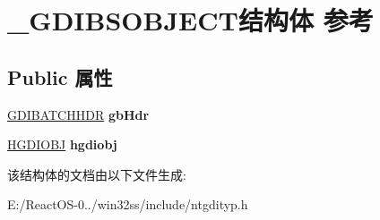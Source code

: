 \hypertarget{struct___g_d_i_b_s_o_b_j_e_c_t}{}\section{\+\_\+\+G\+D\+I\+B\+S\+O\+B\+J\+E\+C\+T结构体 参考}
\label{struct___g_d_i_b_s_o_b_j_e_c_t}
\subsection*{Public 属性}
\begin{DoxyCompactItemize}
\item 
\mbox{\label{struct___g_d_i_b_s_o_b_j_e_c_t_aeb4b0a990e945eda07145e23cf20ba4d}} 
\hyperlink{struct___g_d_i_b_a_t_c_h_h_d_r}{G\+D\+I\+B\+A\+T\+C\+H\+H\+DR} {\bfseries gb\+Hdr}
\item 
\mbox{\label{struct___g_d_i_b_s_o_b_j_e_c_t_a57af44a5e718431b989a898419a92f5d}} 
\hyperlink{interfacevoid}{H\+G\+D\+I\+O\+BJ} {\bfseries hgdiobj}
\end{DoxyCompactItemize}


该结构体的文档由以下文件生成\+:\begin{DoxyCompactItemize}
\item 
E\+:/\+React\+O\+S-\/0../win32ss/include/ntgdityp.\+h\end{DoxyCompactItemize}
